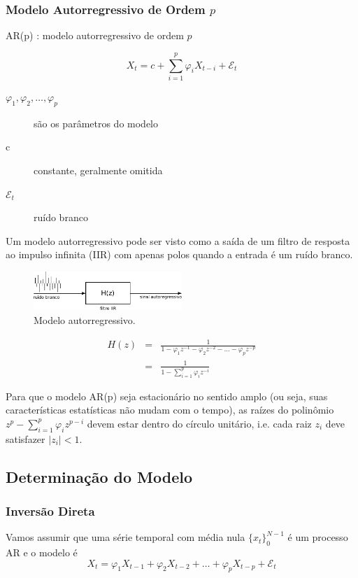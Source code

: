 \begin{frame}[allowframebreaks]
  \frametitle{Modelo Autorregressivo de Ordem $p$}
  AR(p) : modelo autorregressivo de ordem $p$
  
  \begin{equation}
  X_t = c + \sum_{i=1}^p \varphi_i X_{t-i} + \mathcal{E}_t
  \end{equation}
  
  \begin{description}
        \item[$\varphi_1, \varphi_2, \ldots, \varphi_p$] são os parâmetros do modelo
         \item[c] constante, geralmente omitida
         \item[$\mathcal{E}_t$] ruído branco
\end{description}

   Um modelo autorregressivo pode ser visto como a saída de
   um filtro de resposta ao impulso infinita (IIR) com apenas polos
   quando a entrada é um ruído branco.

  \begin{figure}[ht]
    \centering
    \includegraphics[width=0.5\textwidth]{images/ar-iir-filter.pdf}
    \caption{Modelo autorregressivo.}
    \label{fig:ar-iir-filter}
  \end{figure}

  \begin{eqnarray}
  H(z) &=& \frac{1}{1 - \varphi_{1} z^{-1} - \varphi_{2} z^{-2} - \ldots - \varphi_{p} z^{-p}}    \nonumber \\
       &=& \frac{1}{1 - \sum_{i=1}^{p} \varphi_{i} z^{-i}}
  \end{eqnarray}

  Para que o modelo AR(p) seja estacionário no sentido amplo 
  (ou seja, suas características estatísticas não mudam com o tempo), 
  as raízes do
  polinômio $z^p - \sum_{i=1}^{p} \varphi_{i} z^{p-i}$ devem estar dentro do
  círculo unitário, i.e. cada raiz $z_i$ deve satisfazer $\vert z_i \vert <1$.
\end{frame}


\subsection{Determinação do Modelo}
\begin{frame}[allowframebreaks]
  \frametitle{Inversão Direta}
  Vamos assumir que uma série temporal com média nula $\{x_t\}_{0}^{N-1}$
  é um processo AR e o modelo é
  \begin{equation}
        X_{t} = \varphi_1 X_{t-1} + \varphi_2 X_{t-2} + \ldots + \varphi_p X_{t-p} + \mathcal{E}_t
  \end{equation}
\end{frame}

